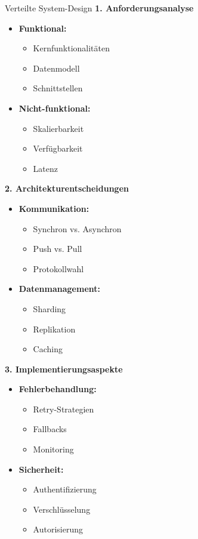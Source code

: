 \begin{KR}{Verteilte System-Design}
\textbf{1. Anforderungsanalyse}
\begin{itemize}
    \item \textbf{Funktional:}
    \begin{itemize}
        \item Kernfunktionalitäten
        \item Datenmodell
        \item Schnittstellen
    \end{itemize}
    \item \textbf{Nicht-funktional:}
    \begin{itemize}
        \item Skalierbarkeit
        \item Verfügbarkeit
        \item Latenz
    \end{itemize}
\end{itemize}

\textbf{2. Architekturentscheidungen}
\begin{itemize}
    \item \textbf{Kommunikation:}
    \begin{itemize}
        \item Synchron vs. Asynchron
        \item Push vs. Pull
        \item Protokollwahl
    \end{itemize}
    \item \textbf{Datenmanagement:}
    \begin{itemize}
        \item Sharding
        \item Replikation
        \item Caching
    \end{itemize}
\end{itemize}

\textbf{3. Implementierungsaspekte}
\begin{itemize}
    \item \textbf{Fehlerbehandlung:}
    \begin{itemize}
        \item Retry-Strategien
        \item Fallbacks
        \item Monitoring
    \end{itemize}
    \item \textbf{Sicherheit:}
    \begin{itemize}
        \item Authentifizierung
        \item Verschlüsselung
        \item Autorisierung
    \end{itemize}
\end{itemize}
\end{KR}

